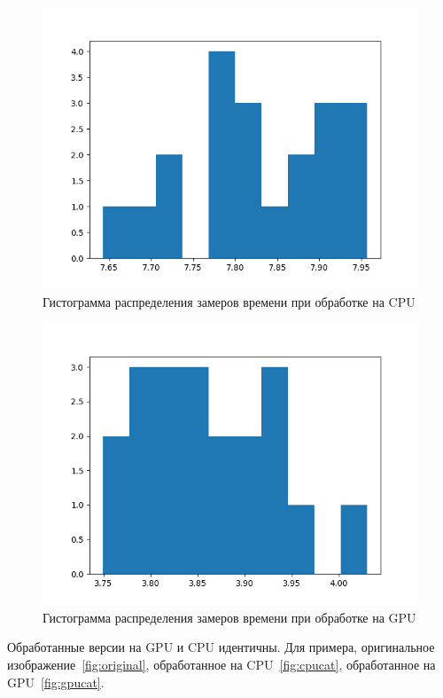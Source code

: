 \begin{figure}[H]
    \centering
    \includegraphics[width=\textwidth]{figures/CPU.png}
    \caption{Гистограмма распределения замеров времени при обработке на CPU}
    \label{fig:cpu}
\end{figure}

\begin{figure}[H]
    \centering
    \includegraphics[width=\textwidth]{figures/GPU.png}
    \caption{Гистограмма распределения замеров времени при обработке на GPU}
    \label{fig:gpu}
\end{figure}

Обработанные версии на GPU и CPU идентичны. Для примера, оригинальное изображение~\ref{fig:original}, обработанное на CPU~\ref{fig:cpucat}, обработанное на GPU~\ref{fig:gpucat}.

